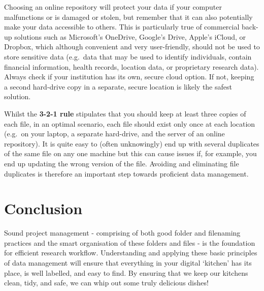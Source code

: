 \documentclass[
  letterpaper,
  DIV=11,
  numbers=noendperiod]{scrreprt}
\begin{document}
Choosing an online repository will protect your data if your computer
malfunctions or is damaged or stolen, but remember that it can also
potentially make your data accessible to others. This is particularly
true of commercial back-up solutions such as Microsoft's OneDrive,
Google's Drive, Apple's iCloud, or Dropbox, which although convenient
and very user-friendly, should not be used to store sensitive data
(e.g.~data that may be used to identify individuals, contain financial
information, health records, location data, or proprietary research
data). Always check if your institution has its own, secure cloud
option. If not, keeping a second hard-drive copy in a separate, secure
location is likely the safest solution.

Whilst the \textbf{3-2-1 rule} stipulates that you should keep at least
three copies of each file, in an optimal scenario, each file should
exist only once at each location (e.g.~on your laptop, a separate
hard-drive, and the server of an online repository). It is quite easy to
(often unknowingly) end up with several duplicates of the same file on
any one machine but this can cause issues if, for example, you end up
updating the wrong version of the file. Avoiding and eliminating file
duplicates is therefore an important step towards proficient data
management.

\section{Conclusion}\label{conclusion}

Sound project management - comprising of both good folder and filenaming
practices and the smart organisation of these folders and files - is the
foundation for efficient research workflow. Understanding and applying
these basic principles of data management will ensure that everything in
your digital `kitchen' has its place, is well labelled, and easy to
find. By ensuring that we keep our kitchens clean, tidy, and safe, we
can whip out some truly delicious dishes!
\end{document}
